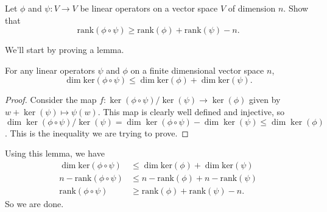 \begin{problem}
  Let $\phi$ and $\psi:V\to V$ be linear operators on a vector space $V$ of dimension $n$. Show that 
  \[\mathrm{rank}(\phi\circ\psi)\geq \mathrm{rank}(\phi)+\mathrm{rank}(\psi)-n.\]
\end{problem}

We'll start by proving a lemma.
\begin{lemma}
  For any linear operators $\psi$ and $\phi$ on a finite dimensional vector space $n$,
  \[
    \dim\mathrm{ker}(\phi\circ\psi)\leq \dim\mathrm{ker}(\phi)+\dim\mathrm{ker}(\psi)
  .\]   
\end{lemma}
\begin{proof}
  Consider the map $f : \ker(\phi\circ\psi)/\ker(\psi) \to \ker(\phi)$ given by $w+\ker(\psi)\mapsto \psi(w)$. This map is clearly well defined and injective, so $\dim \ker(\phi\circ\psi)/\ker(\psi)=\dim\ker(\phi\circ\psi)-\dim\ker(\psi)\leq \dim \ker(\phi)$. This is the inequality we are trying to prove.
\end{proof}

Using this lemma, we have
\[
  \begin{aligned}
    \dim\mathrm{ker}(\phi\circ\psi)&\leq \dim\mathrm{ker}(\phi)+\dim\mathrm{ker}(\psi)\\
    n-\mathrm{rank}(\phi\circ\psi)&\leq n-\mathrm{rank}(\phi)+n-\mathrm{rank}(\psi)\\
    \mathrm{rank}(\phi\circ\psi)&\geq \mathrm{rank}(\phi)+\mathrm{rank}(\psi)-n.
  \end{aligned}
\] 
So we are done.